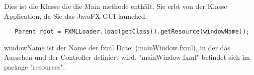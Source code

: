  
Dies ist die Klasse die die Main methode enthält. Sie erbt von der Klasse Application, da Sie das JavaFX-GUI launched.
\begin{lstlisting}
   Parent root = FXMLLoader.load(getClass().getResource(windowName));
\end{lstlisting}
windowName ist der Name der fxml Datei (mainWindow.fxml), in der das Aussehen und der Controller definiert wird. "mainWindow.fxml" befindet sich im package "resources".
